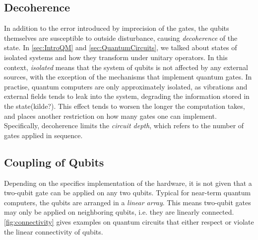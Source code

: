 \subsection{Decoherence}\label{sec:DaEC}
In addition to the error introduced by imprecision of the gates, the qubits themselves are susceptible to outside disturbance, causing \emph{decoherence} of the state. In \autoref{sec:IntroQM} and \autoref{sec:QuantumCircuits}, we talked about states of isolated systems and how they transform under unitary operators. In this context, \emph{isolated} means that the system of qubits is not affected by any external sources, with the exception of the mechanisms that implement quantum gates. In practise, quantum computers are only approximately isolated, as vibrations and external fields tends to leak into the system, degrading the information stored in the state(kilde?). This effect tends to worsen the longer the computation takes, and places another restriction on how many gates one can implement. Specifically, decoherence limits the \emph{circuit depth}, which refers to the number of gates applied in sequence. 

\subsection{Coupling of Qubits}\label{sec:CoQ}
Depending on the specifics implementation of the hardware, it is not given that a two-qubit gate can be applied on any two qubits. Typical for near-term quantum computers, the qubits are arranged in a \emph{linear array}\cite{Holmes_2020}. This means two-qubit gates may only be applied on neighboring qubits, i.e. they are linearly connected. \autoref{fig:connectivity} gives examples on quantum circuits that either respect or violate the linear connectivity of qubits.     

